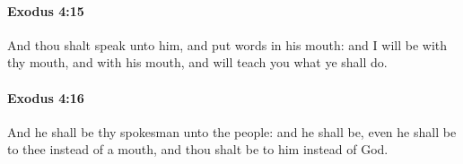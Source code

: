 		\paragraph{Exodus 4:15} %
			\label{EXODUS-4-15}

			And thou shalt speak unto him, and put words in his mouth: and I will be with thy mouth, and with his mouth, and will teach you what ye shall do.


		\paragraph{Exodus 4:16} %
			\label{EXODUS-4-16}

			And he shall be thy spokesman unto the people: and he shall be, even he shall be to thee instead of a mouth, and thou shalt be to him instead of God.


